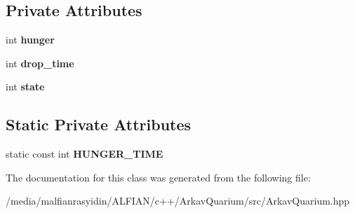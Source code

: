 \subsection*{Private Attributes}
\begin{DoxyCompactItemize}
\item 
\mbox{\label{class_piranha_abea125690488722265177909ed0fdb7e}} 
int {\bfseries hunger}
\item 
\mbox{\label{class_piranha_aa18a001edf0dd5bdc8457cc6b44fc6bf}} 
int {\bfseries drop\+\_\+time}
\item 
\mbox{\label{class_piranha_a14faa0bdb4014e0715e4ecb354cf8f21}} 
int {\bfseries state}
\end{DoxyCompactItemize}
\subsection*{Static Private Attributes}
\begin{DoxyCompactItemize}
\item 
\mbox{\label{class_piranha_ac84644fa2873785ce52c046923059fbe}} 
static const int {\bfseries H\+U\+N\+G\+E\+R\+\_\+\+T\+I\+ME}
\end{DoxyCompactItemize}


The documentation for this class was generated from the following file\+:\begin{DoxyCompactItemize}
\item 
/media/malfianrasyidin/\+A\+L\+F\+I\+A\+N/c++/\+Arkav\+Quarium/src/Arkav\+Quarium.\+hpp\end{DoxyCompactItemize}
